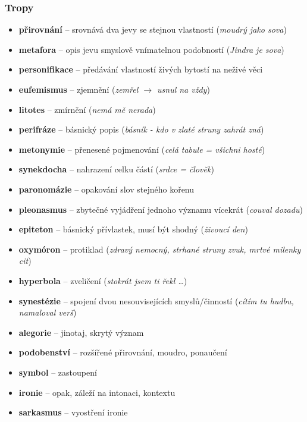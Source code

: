 \subsubsection{Tropy}
\begin{itemize}
\item[] \textbf{přirovnání} -- srovnává dva jevy se stejnou vlastností (\textit{moudrý jako sova})
\item[] \textbf{metafora} -- opis jevu smyslově vnímatelnou podobností (\textit{Jindra je sova})
\item[] \textbf{personifikace} -- předávání vlastností živých bytostí na neživé věci
\item[] \textbf{eufemismus} -- zjemnění (\textit{zemřel $\rightarrow$ usnul na vždy})
\item[] \textbf{litotes} -- zmírnění (\textit{nemá mě nerada})
\item[] \textbf{perifráze} -- básnický popis (\textit{básník - kdo v zlaté struny zahrát zná})
\item[] \textbf{metonymie} -- přenesené pojmenování (\textit{celá tabule = všichni hosté})
\item[] \textbf{synekdocha} -- nahrazení celku částí (\textit{srdce = člověk})
\item[] \textbf{paronomázie} -- opakování slov stejného kořenu
\item[] \textbf{pleonasmus} -- zbytečné vyjádření jednoho významu vícekrát (\textit{couval dozadu})
\item[] \textbf{epiteton} -- básnický přívlastek, musí být shodný (\textit{živoucí den})
\item[] \textbf{oxymóron} -- protiklad (\textit{zdravý nemocný, strhané struny zvuk, mrtvé milenky cit})
\item[] \textbf{hyperbola} -- zveličení (\textit{stokrát jsem ti řekl \ldots})
\item[] \textbf{synestézie} -- spojení dvou nesouvisejících smyslů/činností (\textit{cítím tu hudbu, namaloval verš})
\item[] \textbf{alegorie} -- jinotaj, skrytý význam
\item[] \textbf{podobenství} -- rozšířené přirovnání, moudro, ponaučení
\item[] \textbf{symbol} -- zastoupení
\item[] \textbf{ironie} -- opak, záleží na intonaci, kontextu
\item[] \textbf{sarkasmus} -- vyostření ironie
\end{itemize}


